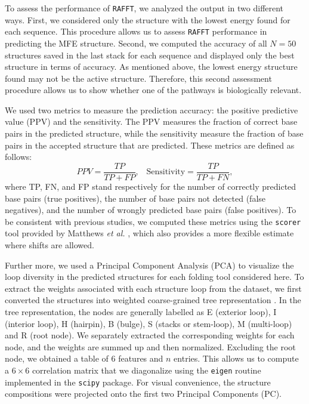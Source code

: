 To assess the performance of \texttt{RAFFT}, we analyzed the output in two different ways. First, we considered only the structure with the lowest energy found for each sequence. This procedure allows us to assess \texttt{RAFFT} performance in predicting the MFE structure. Second, we computed the accuracy of all $N=50$ structures saved in the last stack for each sequence and displayed only the best structure in terms of accuracy. As mentioned above, the lowest energy structure found may not be the active structure. Therefore, this second assessment procedure allows us to show whether one of the pathways is biologically relevant.

We used two metrics to measure the prediction accuracy: the positive predictive value (PPV) and the sensitivity. The PPV measures the fraction of correct base pairs in the predicted structure, while the sensitivity measure the fraction of base pairs in the accepted structure that are predicted. These metrics are defined as follows:
\begin{equation}
PPV = \frac{TP}{TP + FP}, \;\;\; \text{Sensitivity} = \frac{TP}{TP+FN},
\end{equation}
where TP, FN, and FP stand respectively for the number of correctly predicted base pairs (true positives), the number of base pairs not detected (false negatives), and the number of wrongly predicted base pairs (false positives). To be consistent with previous studies, we computed these metrics using the \texttt{scorer} tool provided by Matthews \emph{et al.} \cite{mathews19_how_to_bench_rna_secon}, which also provides a more flexible estimate where shifts are allowed.

Further more, we used a Principal Component Analysis (PCA) to visualize the loop diversity in the predicted structures for each folding tool considered here. To extract the weights associated with each structure loop from the dataset, we first converted the structures into weighted coarse-grained tree representation \cite{shapiro1990comparing}. In the tree representation, the nodes are generally labelled as E (exterior loop), I (interior loop), H (hairpin), B (bulge), S (stacks or stem-loop), M (multi-loop) and R (root node). We separately extracted the corresponding weights for each node, and the weights are summed up and then normalized. Excluding the root node, we obtained a table of $6$ features and \(n\) entries. This allows us to compute a \(6\times 6\) correlation matrix that we diagonalize using the \texttt{eigen} routine implemented in the \texttt{scipy} package. For visual convenience, the structure compositions were projected onto the first two Principal Components (PC). 


